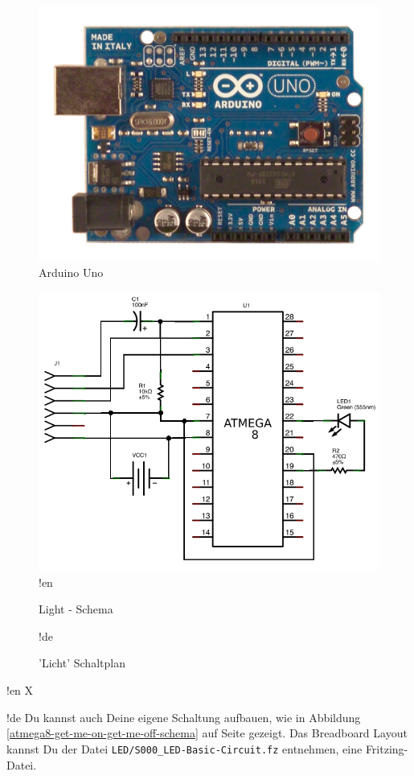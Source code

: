 \documentclass[twoside,12pt,authoryear,openright]{book}
\begin{document}
\begin{figure}[htbp]
  \centering
  \includegraphics[width=120mm]{Media/www-arduino-cc_ArduinoUnoFront.jpeg}
  \caption{Arduino Uno}
  \label{ArduinoUnoFront}
\end{figure}


\begin{figure}[htbp]
  \centering
  \includegraphics[width=120mm]{LED/S000_let-there-be-light/schema_circuit.png}
!en  \caption{Light - Schema}
!de  \caption{'Licht' Schaltplan}
  \label{atmega8-let-there-be-light-schema}
\end{figure}



!en X

!de Du kannst auch Deine eigene Schaltung aufbauen, wie in Abbildung \ref{atmega8-get-me-on-get-me-off-schema} auf Seite \pageref{atmega8-get-me-on-get-me-off-schema} gezeigt. Das Breadboard Layout kannst Du der Datei \texttt{LED/S000\_LED-Basic-Circuit.fz} entnehmen, eine Fritzing-Datei.
\end{document}
